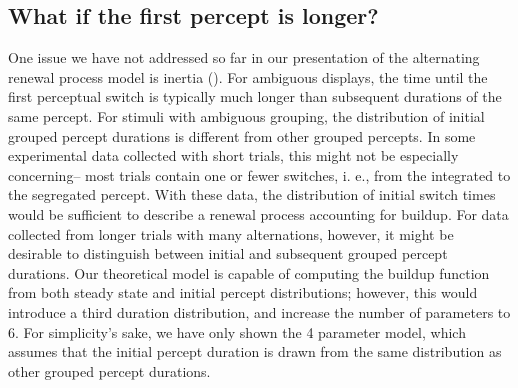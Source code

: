 \documentclass{frontiersSCNS} %
\begin{document}
\subsection{What if the first percept is longer?}

One issue we have not addressed so far in our presentation of the alternating renewal process model is inertia (\cite{Hupe2012}). For ambiguous displays, the time until the first perceptual switch is typically much longer than subsequent durations of the same percept. For stimuli with ambiguous grouping, the distribution of initial grouped percept durations is different from other grouped percepts. In some experimental data collected with short trials, this might not be especially concerning-- most trials contain one or fewer switches, i. e., from the integrated to the segregated percept. With these data, the distribution of initial switch times would be sufficient to describe a renewal process accounting for buildup. For data collected from longer trials with many alternations, however, it might be desirable to distinguish between initial and subsequent grouped percept durations. Our theoretical model is capable of computing the buildup function from both steady state and initial percept distributions; however, this would introduce a third duration distribution, and increase the number of parameters to 6. For simplicity's sake, we have only shown the 4 parameter model, which assumes that the initial percept duration is drawn from the same distribution as other grouped percept durations.
\end{document}
